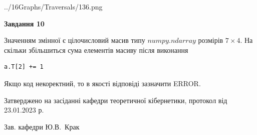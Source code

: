 \documentclass[12pt, ukrainian]{article}
\begin{document}
{\begin {large}
\begin{center}
	{../16Graphs/Traversals/136.png}
\end{center}\par
\newpage

{\begin {center}\textbf{Завдання 10}\end {center}}\par
Значенням змінної  є цілочисловий масив типу $numpy.ndarray$ розмірів $7{\times}4$. На скільки збільшиться сума елементів масиву  після виконання
\begin{verbatim}
a.T[2] += 1
\end{verbatim}


Якщо код некоректний, то в якості відповіді зазначити ERROR.\par
\newpage


\end {large}
}
{\smallskip \begin {small} Затверджено на засіданні кафедри теоретичної кібернетики, протокол  від   23.01.2023 р.\par\smallskip\smallskip
{\parbox {6.5 cm}{Зав. кафедри \dotfill Ю.В.~Крак}} \end{small}}
\end{document}

